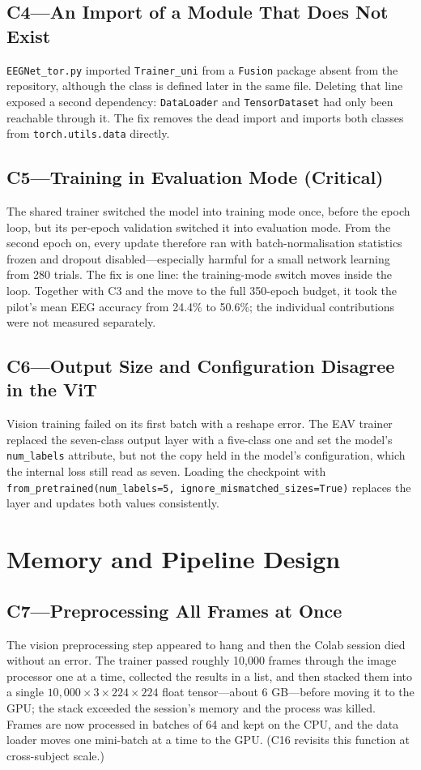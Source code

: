 \subsection*{C4---An Import of a Module That Does Not Exist}
\texttt{EEGNet\_tor.py} imported \texttt{Trainer\_uni} from a \texttt{Fusion} package absent from the repository, although the class is defined later in the same file. Deleting that line exposed a second dependency: \texttt{DataLoader} and \texttt{TensorDataset} had only been reachable through it. The fix removes the dead import and imports both classes from \texttt{torch.utils.data} directly.

\subsection*{C5---Training in Evaluation Mode (Critical)}
The shared trainer switched the model into training mode once, before the epoch loop, but its per-epoch validation switched it into evaluation mode. From the second epoch on, every update therefore ran with batch-normalisation statistics frozen and dropout disabled---especially harmful for a small network learning from 280 trials. The fix is one line: the training-mode switch moves inside the loop. Together with C3 and the move to the full 350-epoch budget, it took the pilot's mean EEG accuracy from 24.4\% to 50.6\%; the individual contributions were not measured separately.

\subsection*{C6---Output Size and Configuration Disagree in the ViT}
Vision training failed on its first batch with a reshape error. The EAV trainer replaced the seven-class output layer with a five-class one and set the model's \texttt{num\_labels} attribute, but not the copy held in the model's configuration, which the internal loss still read as seven. Loading the checkpoint with \texttt{from\_pretrained(num\_labels=5, ignore\_mismatched\_sizes=True)} replaces the layer and updates both values consistently.

\section{Memory and Pipeline Design}

\subsection*{C7---Preprocessing All Frames at Once}
\label{sec:c7}
The vision preprocessing step appeared to hang and then the Colab session died without an error. The trainer passed roughly 10{,}000 frames through the image processor one at a time, collected the results in a list, and then stacked them into a single $10{,}000 \times 3 \times 224 \times 224$ float tensor---about 6 GB---before moving it to the GPU; the stack exceeded the session's memory and the process was killed. Frames are now processed in batches of 64 and kept on the CPU, and the data loader moves one mini-batch at a time to the GPU. (C16 revisits this function at cross-subject scale.)

